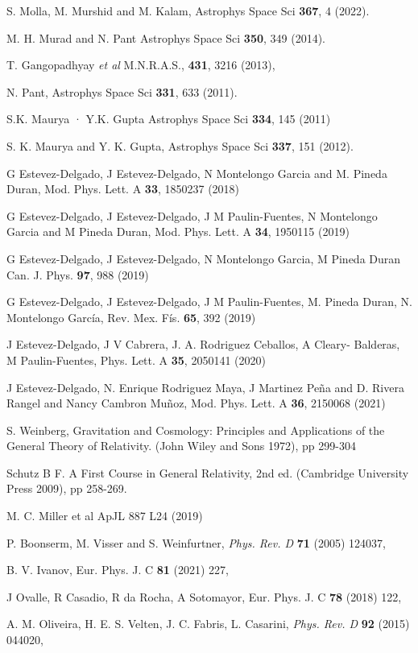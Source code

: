 \documentclass[12pt,onecolumn,a4paper]{article}
\begin{document}
\begin{thebibliography}{99}
S. Molla, M.  Murshid and  M. Kalam,
Astrophys Space Sci {\bf 367}, 4 (2022). 


M. H. Murad and  N. Pant
Astrophys Space Sci {\bf 350}, 349 (2014).

T. Gangopadhyay {\it  et al }
M.N.R.A.S., {\bf 431}, 3216 (2013),  

N. Pant, 
Astrophys Space Sci {\bf 331}, 633 (2011).  

S.K. Maurya · Y.K. Gupta 
Astrophys Space Sci {\bf  334}, 145 (2011)

S. K. Maurya and Y. K.  Gupta,  
Astrophys Space Sci {\bf 337}, 151 (2012).  

G Estevez-Delgado, J Estevez-Delgado, N Montelongo Garcia and M. Pineda Duran, 
Mod. Phys. Lett. A {\bf 33}, 1850237 (2018) 

G Estevez-Delgado, J Estevez-Delgado, J M Paulin-Fuentes, N Montelongo Garcia and M Pineda Duran, 
Mod. Phys. Lett. A {\bf 34}, 1950115 (2019)


G Estevez-Delgado, J Estevez-Delgado, N Montelongo Garcia, M Pineda Duran
Can. J. Phys. {\bf 97}, 988 (2019)

G Estevez-Delgado, J Estevez-Delgado, J M Paulin-Fuentes, M. Pineda Duran, N. Montelongo García, 
Rev. Mex. Fís.  {\bf  65}, 392 (2019)

J Estevez-Delgado, J V Cabrera, J. A. Rodriguez Ceballos, A Cleary-
Balderas, M Paulin-Fuentes, 
Phys. Lett. A {\bf 35}, 2050141 (2020)

J Estevez-Delgado, N. Enrique Rodriguez Maya, J Martinez Peña  and D. Rivera Rangel and Nancy Cambron Muñoz, 
Mod. Phys. Lett. A {\bf 36}, 2150068 (2021)


S. Weinberg,  
Gravitation and Cosmology: Principles and Applications of the General Theory of Relativity. 
(John Wiley and Sons 1972), pp 299-304

 
Schutz B F. A First Course in General Relativity, 2nd ed.  
(Cambridge University Press  2009), pp 258-269.


M. C. Miller et al 
ApJL 887 L24 (2019)

P. Boonserm, M. Visser and S. Weinfurtner,
{\it Phys. Rev. D } {\bf 71}   (2005) 124037,

B. V.  Ivanov, 
Eur. Phys. J. C {\bf 81}  (2021) 227,


J Ovalle, R Casadio, R da Rocha, A Sotomayor,
Eur. Phys. J. C {\bf 78}  (2018) 122,

A. M. Oliveira, H. E. S. Velten, J. C. Fabris, L. Casarini,
{\it Phys. Rev. D} {\bf 92}   (2015) 044020,


\end{thebibliography}
\end{document}
